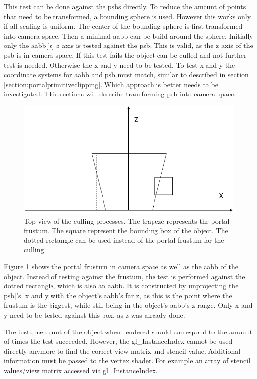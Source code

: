 This test can be done against the \glspl{psb} directly. To reduce the amount of points that need to be transformed, a bounding sphere is used. However this works only if all scaling is uniform. The center of the bounding sphere is first transformed into camera space. Then a minimal \gls{aabb} can be build around the sphere. Initially only the \gls{aabb}['s] z axis is tested against the \gls{psb}. This is valid, as the z axis of the \gls{psb} is in camera space. If this test fails the object can be culled and not further test is needed. Otherwise the x and y need to be tested. To test x and y  the coordinate systems for \gls{aabb} and \gls{psb} must match, similar to described in section \ref{section:portalprimitiveclipping}. Which approach is better needs to be investigated. This sections will describe transforming \gls{psb} into camera space. 

\begin{figure}[h]
	\includegraphics[width=\linewidth]{images/frustumbox.png}
	\caption{Top view of the culling processes. The trapeze represents the portal frustum. The square represent the bounding box of the object. The dotted rectangle can be used instead of the portal frustum for the culling. }
	\label{fig:frustumbox}
\end{figure}

Figure \ref{fig:frustumbox} shows the portal frustum in camera space as well as the \gls{aabb} of the object. Instead of testing against the frustum, the test is performed against the dotted rectangle, which is also an \gls{aabb}. It is constructed by unprojecting the \gls{psb}['s] x and y with the object's \gls{aabb}'s far z, as this is the point where the frustum is the biggest, while still being in the object's \gls{aabb}'s z range. Only x and y need to be tested against this box, as z was already done.


The instance count of the object when rendered should correspond to the amount of times the  test succeeded. However, the gl\_InstanceIndex cannot be used directly anymore to find the correct view matrix and stencil value. Additional information must be passed to the vertex shader. For example an array of stencil values/view matrix accessed via gl\_InstanceIndex.

